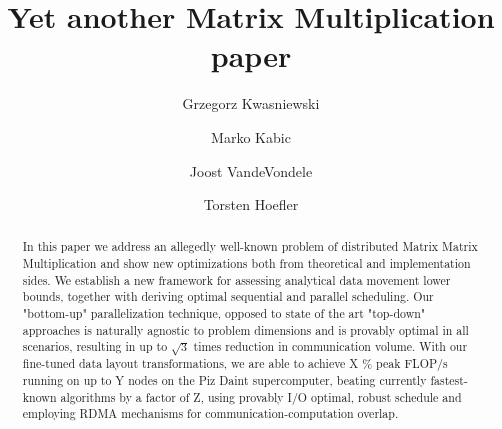 \documentclass[sigconf]{acmart}
\begin{document}
	\title{Yet another Matrix Multiplication paper}
		
	\author{Grzegorz Kwasniewski}
	
			\author{Marko Kabic}
	
			\author{Joost VandeVondele}
	
		\author{Torsten Hoefler}
	
	\begin{abstract}
In this paper we address an allegedly well-known problem of distributed Matrix 
Matrix Multiplication and show new optimizations both from theoretical and 
implementation sides. We establish a new framework for 
assessing 
analytical data movement lower bounds, together with deriving optimal 
sequential and parallel scheduling. Our "bottom-up" parallelization technique, 
opposed to state of the art "top-down" approaches is naturally agnostic to 
problem dimensions and is provably optimal in all scenarios, resulting in up to 
$\sqrt{3}$ times reduction in communication volume. With our 
fine-tuned data layout 
transformations, we are able to achieve X \% peak FLOP/s running on up to Y 
nodes on the Piz Daint supercomputer, beating currently fastest-known 
algorithms by a factor of Z, using provably I/O optimal, robust schedule and 
employing RDMA mechanisms for communication-computation overlap.
	\end{abstract}



\maketitle
\end{document}
